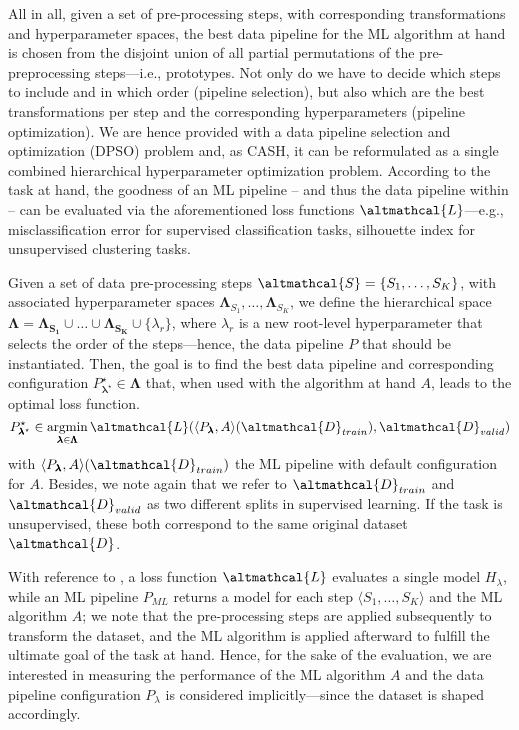All in all, given a set of pre-processing steps, with corresponding transformations and hyperparameter spaces, the best data pipeline for the ML algorithm at hand is chosen from the disjoint union of all partial permutations of the pre-preprocessing steps---i.e., prototypes.
Not only do we have to decide which steps to include and in which order (pipeline selection), but also which are the best transformations per step and the corresponding hyperparameters (pipeline optimization).
We are hence provided with a data pipeline selection and optimization (DPSO) problem \cite{quemy2019data} and, as CASH, it can be reformulated as a single combined hierarchical hyperparameter optimization problem.
According to the task at hand, the goodness of an ML pipeline -- and thus the data pipeline within -- can be evaluated via the aforementioned loss functions $\altmathcal{L}$---e.g., misclassification error for supervised classification tasks, silhouette index for unsupervised clustering tasks.


\begin{definition}
    Given a set of data pre-processing steps $\altmathcal{S} = \{S_1, \dots, S_K\}$, with associated hyperparameter spaces  $\pmb{\Lambda}_{S_1}, \dots, \pmb{\Lambda}_{S_K}$, we define the hierarchical space $\pmb{\Lambda} = \pmb{\Lambda_{S_1}} \cup \dots \cup \pmb{\Lambda_{S_K}} \cup \{\lambda_r\}$, where $\lambda_r$ is a new root-level hyperparameter that selects the order of the steps---hence, the data pipeline $P$ that should be instantiated.
    Then, the goal is to find the best data pipeline and corresponding configuration $P^{\star}_{\pmb{\lambda}^{\star}} \in \pmb{\Lambda}$ that, when used with the algorithm at hand $A$, leads to the optimal loss function.
    \begin{equation*}
        P^{\star}_{\pmb{\lambda}^{\star}} \in \argmin_{\pmb{\lambda} \in \pmb{\Lambda}} \altmathcal{L}(\langle P_{\pmb{\lambda}}, A \rangle (\altmathcal{D}_{train}), \altmathcal{D}_{valid})
    \end{equation*}
    with $\langle P_{\pmb{\lambda}}, A \rangle (\altmathcal{D}_{train})$ the ML pipeline with default configuration for $A$.
    Besides, we note again that we refer to $\altmathcal{D}_{train}$ and $\altmathcal{D}_{valid}$ as two different splits in supervised learning. If the task is unsupervised, these both correspond to the same original dataset $\altmathcal{D}$.
\end{definition}

With reference to , a loss function $\altmathcal{L}$ evaluates a single model $H_{\lambda}$, while an ML pipeline $P_{ML}$ returns a model for each step $\langle S_1, \dots, S_K \rangle$ and the ML algorithm $A$; we note that the pre-processing steps are applied subsequently to transform the dataset, and the ML algorithm is applied afterward to fulfill the ultimate goal of the task at hand.
Hence, for the sake of the evaluation, we are interested in measuring the performance of the ML algorithm $A$ and the data pipeline configuration $P_{\lambda}$ is considered implicitly---since the dataset is shaped accordingly.

